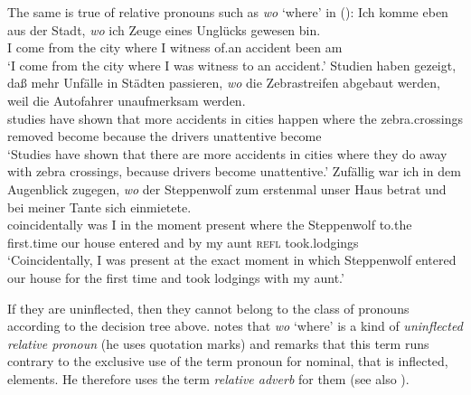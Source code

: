 {The same is true of relative pronouns such as \emph{wo} `where' in ():
\eal
\ex 
\gll Ich komme eben aus der Stadt, \emph{wo} ich Zeuge eines Unglücks gewesen bin.\footnotemark\\
	 I come \particle{} from the city where I witness of.an accident been am\\
\label{bsp-wo-ich-zeuge}
\glt `I come from the city where I was witness to an accident.' 
\ex 
\gll Studien haben gezeigt, daß mehr Unfälle in Städten passieren, \emph{wo} die Zebrastreifen abgebaut werden, weil die Autofahrer unaufmerksam werden.\footnotemark\\
     studies have shown that more accidents in cities happen where the zebra.crossings removed become because the drivers unattentive become\\
\glt `Studies have shown that there are more accidents in cities where they do away with zebra crossings, because drivers become unattentive.'
\ex 
\gll Zufällig war ich in dem Augenblick zugegen, \emph{wo} der Steppenwolf zum erstenmal unser Haus betrat und bei meiner Tante sich einmietete.\footnotemark\\
	 coincidentally was I in the moment present where the Steppenwolf to.the first.time our house entered and by my aunt \textsc{refl} took.lodgings\\

\glt `Coincidentally, I was present at the exact moment in which Steppenwolf entered our house for the first time and took lodgings with my aunt.'
\zl


If they are uninflected, then they cannot belong to the class of pronouns according to the decision tree above.
\citet[]{Eisenberg2004a} notes that \emph{wo} `where' is a kind of \emph{uninflected relative
pronoun} (he uses quotation marks) and remarks that this term runs contrary to the exclusive use of the
term pronoun for nominal, that is inflected, elements. He therefore uses the
term \emph{relative adverb} for them (see also ).

}
